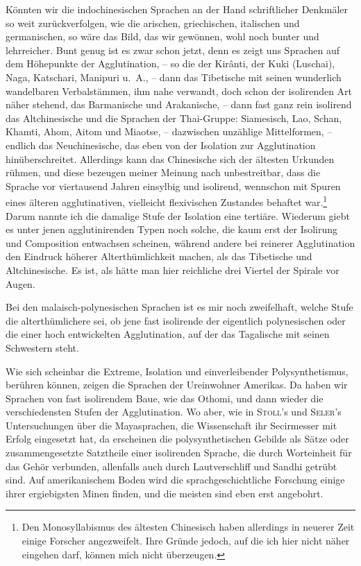 {Könnten wir die indochinesischen Sprachen an der Hand schriftlicher Denkmäler so weit zurückverfolgen, wie die arischen, griechischen, italischen und germanischen, so wäre das Bild, das wir gewönnen, wohl noch bunter und lehrreicher. Bunt genug ist es zwar schon jetzt, denn es zeigt uns Sprachen auf dem Höhepunkte der Agglutination, – so die der Kirânti, der Kuki (Luschai), Naga, Katschari, Manipuri u.~A., – dann das Tibetische mit seinen wunderlich wandelbaren Verbalstämmen, ihm nahe verwandt, doch schon der isolirenden Art näher stehend, das Barmanische und Arakanische, – dann fast ganz rein isolirend das Altchinesische und die Sprachen der Thai-Gruppe: Siamesisch, Lao, Schan, Khamti, Ahom, Aitom und Miaotse, – dazwischen unzählige Mittelformen, – endlich das Neuchinesische, das eben von der Isolation zur Agglutination hinüberschreitet. Allerdings kann das Chinesische sich der ältesten Urkunden rühmen, und diese bezeugen meiner Meinung nach unbestreitbar, dass die Sprache vor viertausend Jahren einsylbig und isolirend, wennschon mit Spuren eines älteren agglutinativen, vielleicht flexivischen Zustandes behaftet war.\footnote{Den Monosyllabismus des ältesten Chinesisch haben allerdings in neuerer Zeit einige Forscher angezweifelt. Ihre Gründe jedoch, auf die ich hier nicht näher eingehen darf, können mich nicht überzeugen.} Darum nannte ich die damalige Stufe der Isolation eine tertiäre. Wiederum giebt es unter jenen agglutinirenden Typen noch solche, die kaum erst der Isolirung und Composition entwachsen scheinen, während andere bei reinerer Agglutination den Eindruck höherer Alterthümlichkeit machen, als das Tibetische und Altchinesische. Es ist, als hätte man hier reichliche drei Viertel der Spirale vor Augen.

Bei den malaisch-polynesischen Sprachen ist es mir noch zweifelhaft, welche Stufe die alterthümlichere sei, ob jene fast isolirende der eigentlich polynesischen oder die einer hoch entwickelten Agglutination, auf der das Tagalische mit seinen Schwestern steht.

\label{fp.253}

Wie sich scheinbar die Extreme, Isolation und einverleibender Polysynthetismus, berühren können, zeigen die Sprachen der Ureinwohner Amerikas. Da haben wir Sprachen von fast isolirendem Baue, wie das Othomi, und dann wieder die verschiedensten Stufen der Agglutination. Wo aber, wie in \textsc{Stoll}’s und \textsc{Seler}’s Untersuchungen über die Mayasprachen, die Wissenschaft ihr Secirmesser mit Erfolg eingesetzt hat, da erscheinen die polysynthetischen Gebilde \label{sp.258} als Sätze oder zusammengesetzte Satztheile einer isolirenden Sprache, die durch Worteinheit für das Gehör verbunden, allenfalls auch durch Lautverschliff und Sandhi getrübt sind. Auf amerikanischem Boden wird die sprachgeschichtliche Forschung einige ihrer ergiebigsten Minen finden, und die meisten sind eben erst angebohrt.

}
